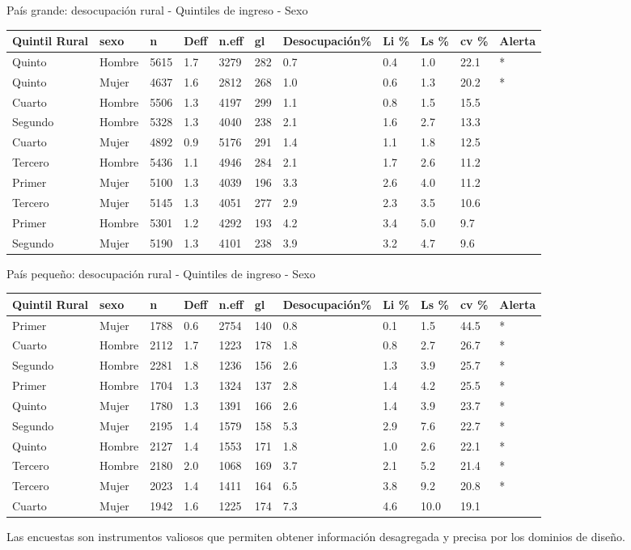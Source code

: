 \documentclass[12pt,spanish,]{book}
\begin{document}
País grande: desocupación rural - Quintiles de ingreso - Sexo

\begin{longtable}[]{@{}lllllllllll@{}}
\toprule
Quintil Rural & sexo & n & Deff & n.eff & gl & Desocupación\% & Li \% & Ls \% & cv \% & Alerta\tabularnewline
\midrule
\endhead
Quinto & Hombre & 5615 & 1.7 & 3279 & 282 & 0.7 & 0.4 & 1.0 & 22.1 & *\tabularnewline
Quinto & Mujer & 4637 & 1.6 & 2812 & 268 & 1.0 & 0.6 & 1.3 & 20.2 & *\tabularnewline
Cuarto & Hombre & 5506 & 1.3 & 4197 & 299 & 1.1 & 0.8 & 1.5 & 15.5 &\tabularnewline
Segundo & Hombre & 5328 & 1.3 & 4040 & 238 & 2.1 & 1.6 & 2.7 & 13.3 &\tabularnewline
Cuarto & Mujer & 4892 & 0.9 & 5176 & 291 & 1.4 & 1.1 & 1.8 & 12.5 &\tabularnewline
Tercero & Hombre & 5436 & 1.1 & 4946 & 284 & 2.1 & 1.7 & 2.6 & 11.2 &\tabularnewline
Primer & Mujer & 5100 & 1.3 & 4039 & 196 & 3.3 & 2.6 & 4.0 & 11.2 &\tabularnewline
Tercero & Mujer & 5145 & 1.3 & 4051 & 277 & 2.9 & 2.3 & 3.5 & 10.6 &\tabularnewline
Primer & Hombre & 5301 & 1.2 & 4292 & 193 & 4.2 & 3.4 & 5.0 & 9.7 &\tabularnewline
Segundo & Mujer & 5190 & 1.3 & 4101 & 238 & 3.9 & 3.2 & 4.7 & 9.6 &\tabularnewline
\bottomrule
\end{longtable}

País pequeño: desocupación rural - Quintiles de ingreso - Sexo

\begin{longtable}[]{@{}lllllllllll@{}}
\toprule
Quintil Rural & sexo & n & Deff & n.eff & gl & Desocupación\% & Li \% & Ls \% & cv \% & Alerta\tabularnewline
\midrule
\endhead
Primer & Mujer & 1788 & 0.6 & 2754 & 140 & 0.8 & 0.1 & 1.5 & 44.5 & *\tabularnewline
Cuarto & Hombre & 2112 & 1.7 & 1223 & 178 & 1.8 & 0.8 & 2.7 & 26.7 & *\tabularnewline
Segundo & Hombre & 2281 & 1.8 & 1236 & 156 & 2.6 & 1.3 & 3.9 & 25.7 & *\tabularnewline
Primer & Hombre & 1704 & 1.3 & 1324 & 137 & 2.8 & 1.4 & 4.2 & 25.5 & *\tabularnewline
Quinto & Mujer & 1780 & 1.3 & 1391 & 166 & 2.6 & 1.4 & 3.9 & 23.7 & *\tabularnewline
Segundo & Mujer & 2195 & 1.4 & 1579 & 158 & 5.3 & 2.9 & 7.6 & 22.7 & *\tabularnewline
Quinto & Hombre & 2127 & 1.4 & 1553 & 171 & 1.8 & 1.0 & 2.6 & 22.1 & *\tabularnewline
Tercero & Hombre & 2180 & 2.0 & 1068 & 169 & 3.7 & 2.1 & 5.2 & 21.4 & *\tabularnewline
Tercero & Mujer & 2023 & 1.4 & 1411 & 164 & 6.5 & 3.8 & 9.2 & 20.8 & *\tabularnewline
Cuarto & Mujer & 1942 & 1.6 & 1225 & 174 & 7.3 & 4.6 & 10.0 & 19.1 &\tabularnewline
\bottomrule
\end{longtable}

Las encuestas son instrumentos valiosos que permiten obtener información desagregada y precisa por los dominios de diseño.
\end{document}
